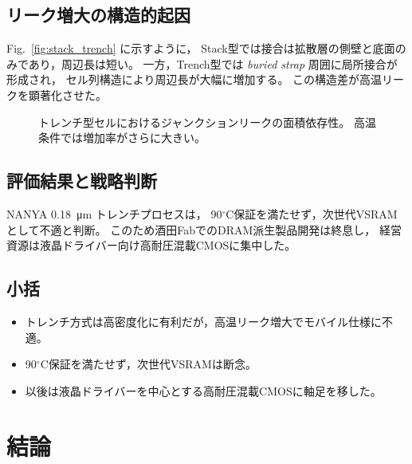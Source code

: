\documentclass[conference]{IEEEtran}
\let\meter\metre
\begin{document}
\subsection{リーク増大の構造的起因}
Fig.~\ref{fig:stack_trench} に示すように，
Stack型では接合は拡散層の側壁と底面のみであり，周辺長は短い。
一方，Trench型では \emph{buried strap} 周囲に局所接合が形成され，
セル列構造により周辺長が大幅に増加する。
この構造差が高温リークを顕著化させた。

\begin{figure}[t]
\centering
{}
\caption{トレンチ型セルにおけるジャンクションリークの面積依存性。
高温条件では増加率がさらに大きい。}
\label{fig:trench_leak}
\end{figure}

\subsection{評価結果と戦略判断}
NANYA \SI{0.18}{\micro\meter} トレンチプロセスは，
90$^\circ$C保証を満たせず，次世代VSRAMとして不適と判断。
このため酒田FabでのDRAM派生製品開発は終息し，
経営資源は液晶ドライバー向け高耐圧混載CMOSに集中した。

\subsection{小括}
\begin{itemize}
  \item トレンチ方式は高密度化に有利だが，高温リーク増大でモバイル仕様に不適。
  \item 90$^\circ$C保証を満たせず，次世代VSRAMは断念。
  \item 以後は液晶ドライバーを中心とする高耐圧混載CMOSに軸足を移した。
\end{itemize}

\section{結論}
\end{document}
